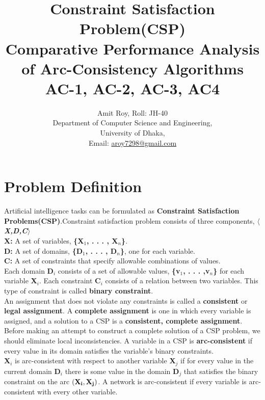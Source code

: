 \documentclass[conference]{IEEEtran}
\newcommand\tab[1][0.5cm]{\hspace*{#1}}
\begin{document}
\title{\LARGE Constraint Satisfaction Problem(CSP) \\Comparative Performance Analysis of Arc-Consistency Algorithms\\AC-1, AC-2, AC-3, AC4}
\author
{	Amit Roy, Roll: JH-40
	\\Department of Computer Science and Engineering,\\University of Dhaka,\\Email: \href{mailto:aroy7298@gmail.com}{aroy7298@gmail.com}
}
\maketitle
\section{Problem Definition}
\label{Introduction}
\fontsize{9.9pt}{9.9pt}\selectfont\noindent
Artificial intelligence tasks can be formulated as \textbf{Constraint Satisfaction Problems(CSP)}.Constraint satisfaction problem consists of three components, $\langle$ \textbf{\textit{X,D,C}}$\rangle$\\
\tab\textbf{X:} A set of variables, \textbf{\{X$_1$, . . . , X$_n$\}}.\\
\tab\textbf{D:} A set of domains, \textbf{\{D$_1$, . . . , D$_n$\}}, one for each variable.\\
\tab\textbf{C:} A set of constraints that specify allowable 
\tab combinations of values.\\
Each domain \textbf{D$_i$} consists of a set of allowable values, \textbf{\{v$_1$, . . . ,v$_n$\}} for each variable \textbf{X$_i$}. Each constraint \textbf{C$_i$} consists of a relation between two variables. This type of constraint is called \textbf{binary constraint}.\\\noindent
\noindent An assignment that does not violate any constraints is called a \textbf{consistent} or \textbf{legal assignment}. A \textbf{complete assignment} is one in which every variable is assigned, and a solution to a CSP is a \textbf{consistent, complete assignment}.\\
\noindent Before making an attempt to construct a complete solution of a CSP problem, we should eliminate local inconsistencies. A variable in a CSP is \textbf{arc-consistent} if every value in its domain satisfies the variable's binary constraints.\\
\noindent \textbf{X$_i$} is arc-consistent with respect to another variable \textbf{X$_j$} if for every value in the current domain \textbf{D$_i$} there is some value in the domain \textbf{D$_j$} that satisfies the binary constraint on the arc $\bf{\left(X_{i},X_{j}\right)}$. A network is arc-consistent if every variable is arc-consistent with every other variable.\\
\end{document}
